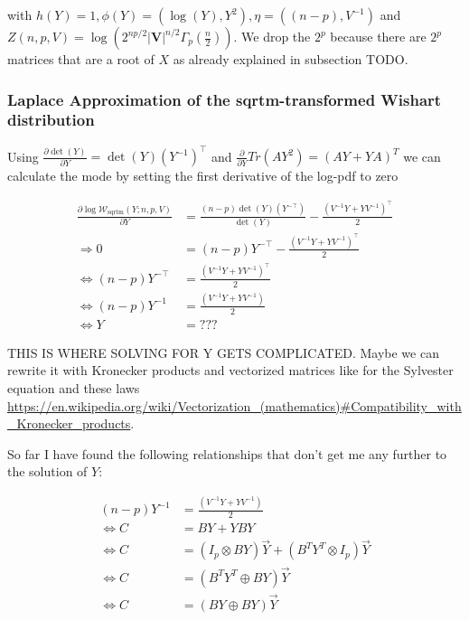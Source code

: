 with $h(Y) = 1, \phi(Y)=(\log(Y), Y^2), \eta=((n-p), V^{-1})$ and $Z(n,p,V)=\log\left(2^{np/2} \left|{\mathbf V}\right|^{n/2} \Gamma_p\left(\frac {n}{2}\right )\right)$. 
We drop the $2^p$ because there are $2^p$ matrices that are a root of $X$ as already explained in subsection TODO. 

\subsubsection{Laplace Approximation of the sqrtm-transformed Wishart distribution}

Using $\frac{\partial \det(Y)}{\partial Y} = \det(Y)(Y^{-1})^\top$ and $\frac{\partial}{\partial Y} Tr(AY^2) = (AY + YA)^T$ we can calculate the mode by setting the first derivative of the log-pdf to zero

\begin{subequations}
\begin{align}
\frac{\partial \log \mathcal{W}_{\text{sqrtm}}(Y; n,p,V)}{\partial Y} &= \frac{(n-p)\det(Y)(Y^{-\top})}{\det(Y)} - \frac{(V^{-1}Y + YV^{-1})^\top}{2} \\
\Rightarrow 0 &= (n-p)Y^{-\top} - \frac{(V^{-1}Y + YV^{-1})^\top}{2} \\
\Leftrightarrow  (n-p)Y^{-\top} &=  \frac{(V^{-1}Y + YV^{-1})^\top}{2} \\
\Leftrightarrow  (n-p)Y^{-1} &=  \frac{(V^{-1}Y + YV^{-1})}{2} \\
\Leftrightarrow Y &= ???
\end{align}
\end{subequations}

THIS IS WHERE SOLVING FOR Y GETS COMPLICATED. Maybe we can rewrite it with Kronecker products and vectorized matrices like for the Sylvester equation and these laws \url{https://en.wikipedia.org/wiki/Vectorization_(mathematics)#Compatibility_with_Kronecker_products}.

So far I have found the following relationships that don't get me any further to the solution of $Y$:

\begin{align*}
(n-p)Y^{-1} &=  \frac{(V^{-1}Y + YV^{-1})}{2} \\
\Leftrightarrow C &= BY + YBY \\
\Leftrightarrow C &= (I_p \otimes BY)\vec{Y} + (B^TY^T \otimes I_p)\vec{Y} \\
\Leftrightarrow C &= (B^TY^T \oplus BY)\vec{Y} \\
\Leftrightarrow C &= (BY \oplus BY)\vec{Y}
\end{align*}

